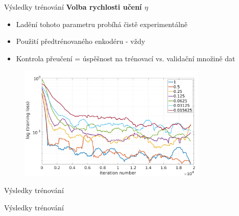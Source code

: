 \documentclass[aspectratio=1610]{beamer}
\begin{document}
\begin{frame}{Výsledky trénování}
\textbf{Volba rychlosti učení $ \eta $}
\begin{itemize}
	\item Ladění tohoto parametru probíhá čistě experimentálně
	\item Použití předtrénovaného enkodéru - vždy
	\item Kontrola přeučení = úspěšnost na trénovací vs. validační množině dat	
\end{itemize}
\begin{figure}[h]
	\begin{center}
		\includegraphics[width=9cm, keepaspectratio]{result.png}
	\end{center}		
\end{figure}
\end{frame}
\begin{frame}{Výsledky trénování}
\begin{center}
\end{center}
\end{frame}
\begin{frame}{Výsledky trénování}
\centering
{}
\end{frame}
\end{document}
